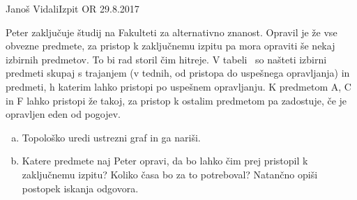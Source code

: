 \begin{naloga}{Janoš Vidali}{Izpit OR 29.8.2017}
\begin{vprasanje}[studij]
Peter zaključuje študij na Fakulteti za alternativno znanost.
Opravil je že vse obvezne predmete,
za pristop k zaključnemu izpitu pa mora opraviti še nekaj izbirnih predmetov.
To bi rad storil čim hitreje.
V tabeli~\tab{} so našteti izbirni predmeti
skupaj s trajanjem (v tednih, od pristopa do uspešnega opravljanja)
in predmeti, h katerim lahko pristopi po uspešnem opravljanju.
K predmetom A, C in F lahko pristopi že takoj,
za pristop k ostalim predmetom pa zadostuje, če je opravljen eden od pogojev.

\begin{enumerate}[(a)]
\item Topološko uredi ustrezni graf in ga nariši.
\item Katere predmete naj Peter opravi,
da bo lahko čim prej pristopil k zaključnemu izpitu?
Koliko časa bo za to potreboval?
Natančno opiši postopek iskanja odgovora.
\end{enumerate}

\begin{tabela}
\end{tabela}
\end{vprasanje}
\begin{odgovor}
\end{odgovor}
\end{naloga}


